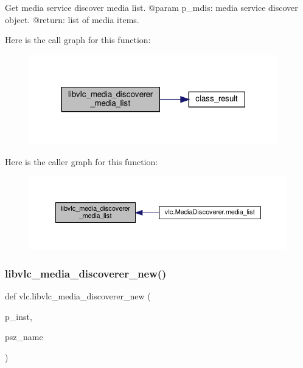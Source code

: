 \begin{DoxyVerb}Get media service discover media list.
@param p_mdis: media service discover object.
@return: list of media items.
\end{DoxyVerb}
 Here is the call graph for this function\+:
\nopagebreak
\begin{figure}[H]
\begin{center}
\leavevmode
\includegraphics[width=306pt]{namespacevlc_a7a67121178840567c764d45a7965d52b_cgraph}
\end{center}
\end{figure}
Here is the caller graph for this function\+:
\nopagebreak
\begin{figure}[H]
\begin{center}
\leavevmode
\includegraphics[width=350pt]{namespacevlc_a7a67121178840567c764d45a7965d52b_icgraph}
\end{center}
\end{figure}
\mbox{\label{namespacevlc_aca3af54c1b5d61bc7877d189b8fda18b}} 
\subsubsection{\texorpdfstring{libvlc\+\_\+media\+\_\+discoverer\+\_\+new()}{libvlc\_media\_discoverer\_new()}}
{\footnotesize\ttfamily def vlc.\+libvlc\+\_\+media\+\_\+discoverer\+\_\+new (\begin{DoxyParamCaption}\item[{}]{p\+\_\+inst,  }\item[{}]{psz\+\_\+name }\end{DoxyParamCaption})}

